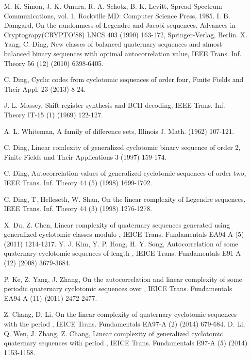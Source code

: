 \documentclass{mcom-l}
\theoremstyle{definition}
\numberwithin{equation}{section}
\begin{document}

\begin{thebibliography}{99} M. K. Simon, J. K. Omura, R. A. Schotz,  B. K. Levitt, Spread Spectrum Communications, vol. 1, Rockville MD: Computer Science Press, 1985.
 I. B. Damgard,  On the randomness of Legendre and Jacobi sequences, Advances in Cryptograpy(CRYPTO’88) LNCS 403 (1990) 163-172, Springer-Verlag, Berlin.
 X. Yang, C. Ding,  New classes of balanced quaternary sequences and almost balanced binary sequences with optimal autocorrelation value, IEEE Trans. Inf. Theory 56 (12)  (2010) 6398-6405.

 C. Ding, Cyclic codes from cyclotomic sequences of order four, Finite Fields and Their Appl. 23 (2013) 8-24.

 J. L. Massey, Shift register synthesis and BCH decoding, IEEE Trans. Inf. Theory IT-15 (1) (1969) 122-127.

A. L. Whiteman,  A family of difference sets, Illinois J. Math. (1962) 107-121.

 C. Ding,  Linear comlexity of generalized cyclotomic binary sequence of order 2, Finite Fields and Their Applications 3 (1997) 159-174.

 C. Ding,  Autocorrelation values of generalized cyclotomic sequences of order two, IEEE Trans. Inf. Theory 44 (5) (1998) 1699-1702.

 C. Ding, T. Helleseth, W. Shan, On the linear complexity of Legendre sequences, IEEE Trans. Inf. Theory 44 (3) (1998) 1276-1278.

 X. Du, Z. Chen,  Linear complexity of quaternary sequences generated using generalized cyclotomic classes modulo , IEICE Trans. Fundamentals EA94-A (5) (2011) 1214-1217.
 Y. J. Kim, Y. P. Hong,  H. Y. Song, Autocorrelation of some quaternary cyclotomic sequences of length , IEICE Trans. Fundamentals E91-A (12) (2008) 3679-3684.

 P. Ke, Z. Yang,  J. Zhang, On the autocorrelation and linear complexity of some  periodic quaternary cyclotomic sequences over , IEICE Trans. Fundamentals EA94-A (11) (2011) 2472-2477.

 Z. Chang,  D. Li,  On the linear complexity of quaternary cyclotomic sequences with the period , IEICE Trans. Fundamentals EA97-A (2) (2014) 679-684.
 D. Li, Q. Wen, J. Zhang, Z. Chang, Linear complexity of generalized cyclotomic quaternary sequences with period , IEICE Trans. Fundamentals E97-A (5)  (2014)  1153-1158.


\end{thebibliography}
\end{document}
